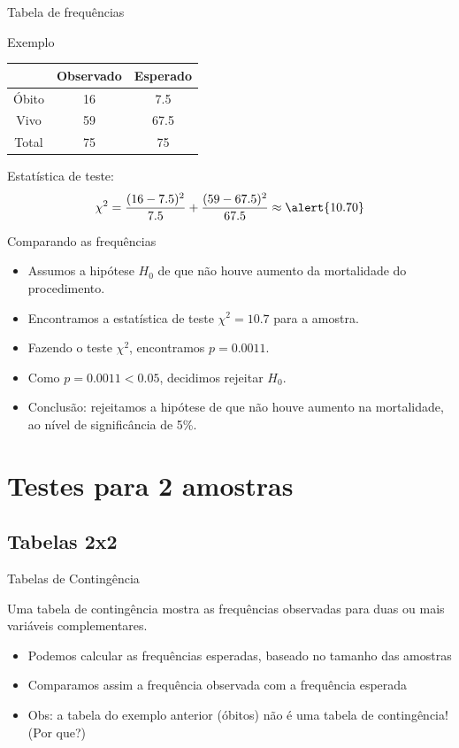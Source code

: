 \documentclass{beamer}
\begin{document}
\begin{frame}{Tabela de frequências}
  \begin{exampleblock}{Exemplo}
    \begin{tabular}{c|c|c}
      & Observado & Esperado\\
      \hline
      Óbito & 16 & 7.5 \\
      \hline
      Vivo & 59 & 67.5 \\
      \hline
      Total & 75 & 75\\
    \end{tabular}
  \end{exampleblock}

Estatística de teste:
  \begin{displaymath}
    \chi^2 = \frac{(16 - 7.5)^2}{7.5} + \frac{(59 - 67.5)^2}{67.5} \approx \alert{10.70}
  \end{displaymath}
\end{frame}

\begin{frame}{Comparando as frequências}
  \begin{itemize}
  \item Assumos a hipótese $H_0$ de que não houve aumento da
    mortalidade do procedimento.
  \item Encontramos a estatística de teste $\chi^2 = 10.7$ para a
    amostra.
  \item Fazendo o teste $\chi^2$, encontramos $p=0.0011$.
  \item Como $p=0.0011 < 0.05$, decidimos \alert{rejeitar} $H_0$.
  \item Conclusão: rejeitamos a hipótese de que não houve aumento na
    mortalidade, ao nível de significância de 5\%.
  \end{itemize}
\end{frame}

\section[2 amostras]{Testes para 2 amostras}

\subsection{Tabelas 2x2}

\begin{frame}{Tabelas de Contingência}
  \begin{definition}
    Uma \alert{tabela de contingência} mostra as frequências
    observadas para duas ou mais variáveis complementares.
  \end{definition}
  \begin{itemize}
  \item Podemos calcular as frequências esperadas, baseado no tamanho
    das amostras
  \item Comparamos assim a frequência observada com a frequência
    esperada
  \item Obs: a tabela do exemplo anterior (óbitos) \alert{não é} uma
    tabela de contingência! (Por que?)
  \end{itemize}
\end{frame}
\end{document}

